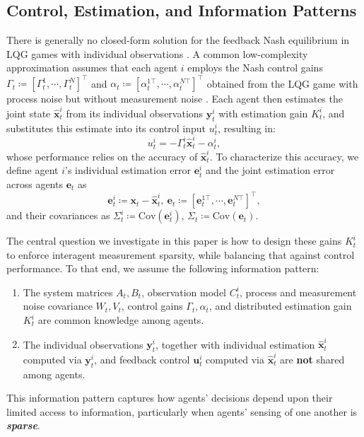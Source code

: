 \documentclass[letterpaper, 10 pt, conference]{ieeeconf}  %
\begin{document}
\subsection{Control, Estimation, and Information Patterns}
There is generally no closed-form solution for the feedback Nash equilibrium in LQG games with individual observations \cite{witsenhausen1968counterexample}. A common low-complexity approximation assumes that each agent $i$ employs the Nash control gains $\Gamma_t\coloneqq[\Gamma_t^1,\cdots,\Gamma_t^N]^\top$ and $\alpha_t\coloneqq[\alpha_t^{1\top},\cdots,\alpha_t^{N\top}]^\top$ obtained from the LQG game with process noise but without measurement noise \cite{liu2024policies, SmoothGameTheory}. Each agent then estimates the joint state $\hat{\textbf{x}}_t^i$ from its individual observations $\textbf{y}_t^i$ with estimation gain $K_t^i$, and substitutes this estimate into its control input $u_t^i$, resulting in:
\begin{equation}
    u_t^i=-\Gamma_t^i\hat{\textbf{x}}_t^i-\alpha_t^i,\label{eqn:actual_single_ctrl}
\end{equation}
whose performance relies on the accuracy of $\hat{\textbf{x}}_t^i$. To characterize this accuracy, we define agent $i$'s individual estimation error $\textbf{e}_t^i$ and the joint estimation error across agents $\textbf{e}_t$ as
\begin{equation*}
    \textbf{e}_t^i\coloneqq\textbf{x}_t-\hat{\textbf{x}}_t^i,\ \textbf{e}_t\coloneqq[\textbf{e}_t^{1\top},\cdots,\textbf{e}_t^{N\top}]^\top,
\end{equation*}
and their covariances as $\Sigma_t^i\coloneqq \text{Cov}(\textbf{e}_t^i)$, $\Sigma_t\coloneqq \text{Cov}(\textbf{e}_t)$. 

The central question we investigate in this paper is how to design these gains $K_t^i$ to enforce interagent measurement sparsity, while balancing that against control performance. To that end, we assume the following information pattern:
\begin{enumerate}
    \item The system matrices $A_t,B_t$, observation model $C_t^i$, process and measurement noise covariance $W_t, V_t$, control gains $\Gamma_t,\alpha_t$, and distributed estimation gain $K_t^i$ are common knowledge among agents. 
    \item The individual observations $\textbf{y}_t^i$, together with individual estimation $\hat{\textbf{x}}_t^i$ computed via $\textbf{y}_t^i$, and feedback control $\textbf{u}_t^i$ computed via $\hat{\textbf{x}}_t^i$ are \textbf{not} shared among agents.
\end{enumerate}
This information pattern captures how agents' decisions depend upon their limited access to information, particularly when agents' sensing of one another is \textit{\textbf{sparse}}.
\end{document}
